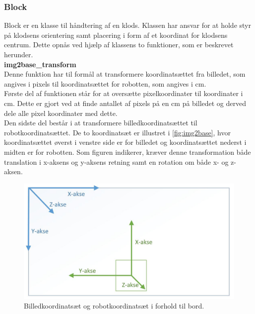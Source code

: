 \subsubsection{Block} %
\label{subsub:block}

Block er en klasse til håndtering af en klods. Klassen har ansvar for at holde styr på klodsens orientering samt placering i form af et koordinat for klodsens centrum. Dette opnås ved hjælp af klassens to funktioner, som er beskrevet herunder. \\

\textbf{img2base\_transform} \\
Denne funktion har til formål at transformere koordinatsættet fra billedet, som angives i pixels til koordinatsættet for robotten, som angives i cm.\\

Første del af funktionen står for at oversætte pixelkoordinater til koordinater i cm. Dette er gjort ved at finde antallet af pixels på en cm på billedet og derved dele alle pixel koordinater med dette. \\

Den sidste del består i at transformere billedkoordinatsættet til robotkoordinatsættet. De to koordinatsæt er illustret i \autoref{fig:img2base}, hvor koordinatsættet øverst i venstre side er for billedet og koordinatsættet nederst i midten er for robotten. Som figuren indikerer, kræver denne transformation både translation i x-aksens og y-aksens retning samt en rotation om både x- og z-aksen. \\


\begin{figure}[H]
\centering
\includegraphics[scale=0.4]{images/img2base}
\caption{Billedkoordinatsæt og robotkoordinatsæt i forhold til bord.}
\label{fig:img2base}
\end{figure}

